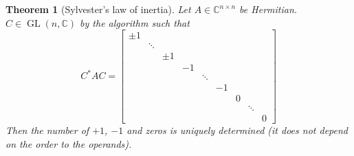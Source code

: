 \documentclass[a4paper]{article}
\newcounter{lecref}[section]
\numberwithin{lecref}{section}
\newtheorem{theorem}[lecref]{Theorem}
\begin{document}
\begin{theorem}[Sylvester's law of inertia]
  Let $A \in \mathbb C^{n\times n}$ be Hermitian.
  $C \in \operatorname{GL}(n, \mathbb C)$ by the algorithm
  such that
  \[ C^* AC = \begin{bmatrix}
    \pm 1 &        &       &    &        &    &   &        & \\
          & \ddots &       &    &        &    &   &        & \\
          &        & \pm 1 &    &        &    &   &        & \\
          &        &       & -1 &        &    &   &        & \\
          &        &       &    & \ddots &    &   &        & \\
          &        &       &    &        & -1 &   &        & \\
          &        &       &    &        &    & 0 &        & \\
          &        &       &    &        &    &   & \ddots & \\
          &        &       &    &        &    &   &        & 0
    \end{bmatrix}
  \]
  Then the number of $+1$, $-1$ and zeros is uniquely determined
  (it does not depend on the order to the operands).
\end{theorem}
\end{document}

